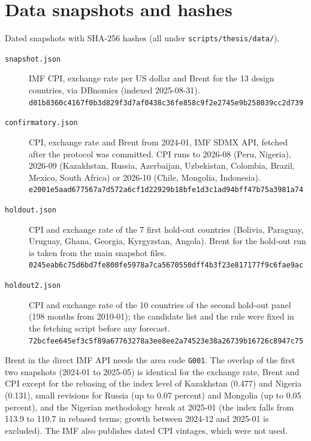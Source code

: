 \section{Data snapshots and hashes}\label{app:data}

Dated snapshots with SHA-256 hashes (all under \texttt{scripts/thesis/data/}).
\begin{description}
\item[\texttt{snapshot.json}] IMF CPI, exchange rate per US dollar and Brent for the 13 design countries, via DBnomics (indexed 2025-08-31).\\
{\footnotesize\texttt{d01b8360c4167f0b3d829f3d7af0438c36fe858c9f2e2745e9b258039cc2d739}}
\item[\texttt{confirmatory.json}] CPI, exchange rate and Brent from 2024-01, IMF SDMX API, fetched after the protocol was committed. CPI runs to 2026-08 (Peru, Nigeria), 2026-09 (Kazakhstan, Russia, Azerbaijan, Uzbekistan, Colombia, Brazil, Mexico, South Africa) or 2026-10 (Chile, Mongolia, Indonesia).\\
{\footnotesize\texttt{e2001e5aad677567a7d572a6cf1d22929b18bfe1d3c1ad94bff47b75a3981a74}}
\item[\texttt{holdout.json}] CPI and exchange rate of the 7 first hold-out countries (Bolivia, Paraguay, Uruguay, Ghana, Georgia, Kyrgyzstan, Angola). Brent for the hold-out run is taken from the main snapshot files.\\
{\footnotesize\texttt{0245eab6c75d6bd7fe800fe5978a7ca5670550dff4b3f23e817177f9c6fae9ac}}
\item[\texttt{holdout2.json}] CPI and exchange rate of the 10 countries of the second hold-out panel (198 months from 2010-01); the candidate list and the rule were fixed in the fetching script before any forecast.\\
{\footnotesize\texttt{72bcfee645ef3c5f89a67763278a3ee8ee2a74523e38a26739b16726c8947c75}}
\end{description}
Brent in the direct IMF API needs the area code \texttt{G001}. The overlap of the first two snapshots (2024-01 to 2025-05) is identical for the exchange rate, Brent and CPI except for the rebasing of the index level of Kazakhstan (0.477) and Nigeria (0.131), small revisions for Russia (up to 0.07 percent) and Mongolia (up to 0.05 percent), and the Nigerian methodology break at 2025-01 (the index falls from 113.9 to 110.7 in rebased terms; growth between 2024-12 and 2025-01 is excluded). The IMF also publishes dated CPI vintages, which were not used.

